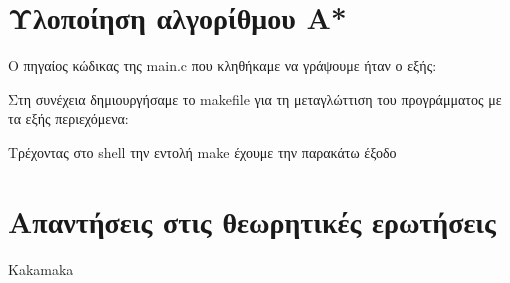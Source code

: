 \documentclass[a4paper,10pt]{article} \usepackage{anysize}
\begin{document}


\section*{Υλοποίηση αλγορίθμου A*} \setcounter{section}{1}
Ο πηγαίος κώδικας της main.c που κληθήκαμε να γράψουμε ήταν ο εξής:

Στη συνέχεια δημιουργήσαμε το makefile για  τη μεταγλώττιση του προγράμματος
με τα εξής περιεχόμενα:


Τρέχοντας στο shell την εντολή make έχουμε την παρακάτω έξοδο

\section*{Απαντήσεις στις θεωρητικές ερωτήσεις}
Kakamaka
\end{document}
